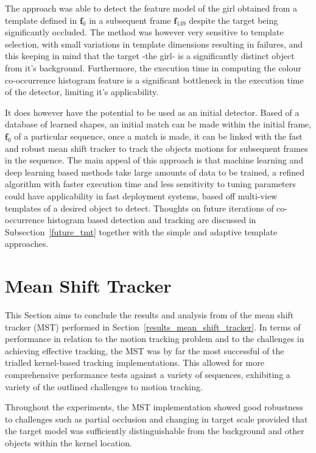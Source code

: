 The approach was able to detect the feature model of the girl obtained from a
template defined in $\mathbf{f}_0$ in a subsequent frame $\mathbf{f}_{139}$
despite the target being significantly occluded.  The method was however very
sensitive to template selection, with small variations in template dimensions
resulting in failures, and this keeping in mind that the target -the girl- is a
significantly distinct object from it's background. 
Furthermore, the execution time in computing the colour co-occurrence histogram
feature is a significant bottleneck in the execution time of the detector,
limiting it's applicability. 

It does however have the potential to be used as an initial detector. Based of a
database of learned shapes, an initial match can be made within the initial
frame, $\mathbf{f}_0$ of a particular sequence, once a match is made, it can be
linked with the fast and robust mean shift tracker to track the objects motions
for subsequent frames in the sequence.  The main appeal of this approach is that
machine learning and deep learning based methods take large amounts of data to
be trained, a refined algorithm with faster execution time and less sensitivity
to tuning parameters could have applicability in fast deployment systems, based
off multi-view templates of a desired object to detect. Thoughts on future
iterations of co-occurrence histogram based detection and tracking are discussed
in Subsection~\ref{future_tmt} together with the simple and adaptive template
approaches.

\section{Mean Shift Tracker}
This Section aims to conclude the results and analysis from of the mean shift
tracker (MST) performed in Section~\ref{results_mean_shift_tracker}.
In terms of performance in relation to the motion tracking problem and to the
challenges in achieving effective tracking, the MST was by far
the most successful of the trialled kernel-based tracking implementations.
This allowed for more comprehensive performance tests against a variety of
sequences, exhibiting a variety of the outlined challenges to motion tracking.

Throughout the experiments, the MST implementation showed good robustness to
challenges such as partial occlusion and changing in target scale provided that
the target model was sufficiently distinguishable from the background and other
objects within the kernel location.

